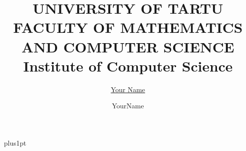 \documentclass[twoside,11pt]{Latex/Classes/PhDthesisPSnPDF}
\title{UNIVERSITY OF TARTU \\
	FACULTY OF MATHEMATICS AND COMPUTER SCIENCE \\
	Institute of Computer Science}
\author{\href{mailto:email@ut.ee}{Your Name}}
\author{YourName}
\begin{document}

\renewcommand\baselinestretch{1.2}
\baselineskip=18pt plus1pt


















%
%   



%
%
\end{document}
